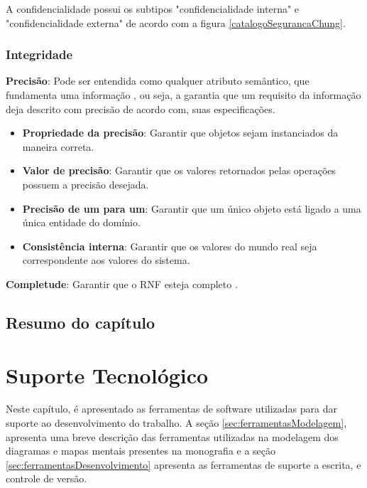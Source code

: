 A confidencialidade possui os subtipos "confidencialidade interna" e "confidencialidade externa" de acordo com a figura \ref{catalogoSegurancaChung}.
 

\subsection{Integridade}
 

\textbf{Precisão}: Pode ser entendida como qualquer atributo semântico, que fundamenta uma informação \cite{chung2012non}, ou seja, a garantia que um requisito da informação deja descrito com precisão de acordo com, suas especificações. 

\begin{itemize}
	\item \textbf{Propriedade da precisão}: Garantir que objetos sejam instanciados da maneira correta. 
	
	\item \textbf{Valor de precisão}: Garantir que os valores retornados pelas operações possuem a precisão desejada.
	
	\item \textbf{Precisão de um para um}: Garantir que um único objeto está ligado a uma única entidade do domínio. 
	
	\item \textbf{Consistência interna}: Garantir que os valores do mundo real seja correspondente aos valores do sistema.
\end{itemize}

\textbf{Completude}: Garantir que o RNF esteja completo \cite{chung2012non}. 

\section{Resumo do capítulo}


\chapter{Suporte Tecnológico}

Neste capítulo, é apresentado as ferramentas de software utilizadas para dar suporte ao desenvolvimento do trabalho. A seção \ref{sec:ferramentasModelagem}, apresenta uma breve descrição das ferramentas utilizadas na modelagem dos diagramas e mapas mentais presentes na monografia e a seção \ref{sec:ferramentasDesenvolvimento} apresenta as ferramentas de suporte a escrita, e controle de versão. 

